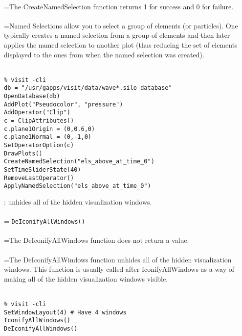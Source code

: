 \documentclass[10pt,a4paper]{report}
\begin{document}
 \\ 
\hangindent=\parindent The CreateNamedSelection function returns 1 for success and 0 for failure. \\[-3mm] 

 \\ 
\hangindent=\parindent Named Selections allow you to select a group of elements (or particles). One typically creates a named selection from a group of elements and then later applies the named selection to another plot (thus reducing the set of elements displayed to the ones from when the named selection was created). \\[-3mm] 

\\[-6mm]
\begin{verbatim}% visit -cli
db = "/usr/gapps/visit/data/wave*.silo database"
OpenDatabase(db)
AddPlot("Pseudocolor", "pressure")
AddOperator("Clip")
c = ClipAttributes()
c.plane1Origin = (0,0.6,0)
c.plane1Normal = (0,-1,0)
SetOperatorOption(c)
DrawPlots()
CreateNamedSelection("els_above_at_time_0")
SetTimeSliderState(40)
RemoveLastOperator()
ApplyNamedSelection("els_above_at_time_0")
\end{verbatim}
\newpage


{}
: unhides all of the hidden visualization windows.\\[-3mm]

 \\ 
\hangindent=\parindent 
\verb!DeIconifyAllWindows()!\\ [-3mm]

 \\ 
\hangindent=\parindent The DeIconifyAllWindows function does not return a value. \\[-3mm] 

 \\ 
\hangindent=\parindent The DeIconifyAllWindows function unhides all of the hidden visualization windows. This function is usually called after IconifyAllWindows as a way of making all of the hidden visualization windows visible. \\[-3mm] 

\\[-6mm]
\begin{verbatim}% visit -cli
SetWindowLayout(4) # Have 4 windows
IconifyAllWindows()
DeIconifyAllWindows()
\end{verbatim}
\newpage
\end{document}
